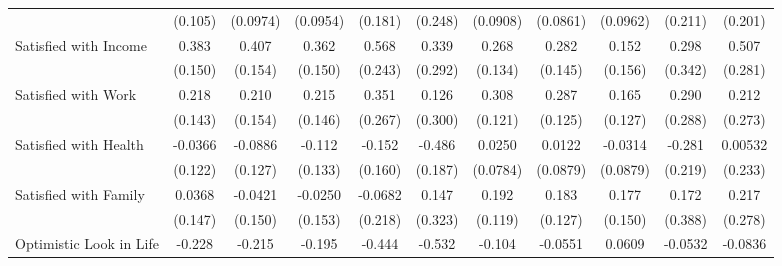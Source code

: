 {\begin{tabular}{l*{10}{c}}
            &     (0.105)         &    (0.0974)         &    (0.0954)         &     (0.181)         &     (0.248)         &    (0.0908)         &    (0.0861)         &    (0.0962)         &     (0.211)         &     (0.201)         \\
\addlinespace
Satisfied with Income&       0.383\sym{*}  &       0.407\sym{**} &       0.362\sym{*}  &       0.568\sym{*}  &       0.339         &       0.268\sym{*}  &       0.282         &       0.152         &       0.298         &       0.507         \\
            &     (0.150)         &     (0.154)         &     (0.150)         &     (0.243)         &     (0.292)         &     (0.134)         &     (0.145)         &     (0.156)         &     (0.342)         &     (0.281)         \\
\addlinespace
Satisfied with Work&       0.218         &       0.210         &       0.215         &       0.351         &       0.126         &       0.308\sym{*}  &       0.287\sym{*}  &       0.165         &       0.290         &       0.212         \\
            &     (0.143)         &     (0.154)         &     (0.146)         &     (0.267)         &     (0.300)         &     (0.121)         &     (0.125)         &     (0.127)         &     (0.288)         &     (0.273)         \\
\addlinespace
Satisfied with Health&     -0.0366         &     -0.0886         &      -0.112         &      -0.152         &      -0.486\sym{**} &      0.0250         &      0.0122         &     -0.0314         &      -0.281         &     0.00532         \\
            &     (0.122)         &     (0.127)         &     (0.133)         &     (0.160)         &     (0.187)         &    (0.0784)         &    (0.0879)         &    (0.0879)         &     (0.219)         &     (0.233)         \\
\addlinespace
Satisfied with Family&      0.0368         &     -0.0421         &     -0.0250         &     -0.0682         &       0.147         &       0.192         &       0.183         &       0.177         &       0.172         &       0.217         \\
            &     (0.147)         &     (0.150)         &     (0.153)         &     (0.218)         &     (0.323)         &     (0.119)         &     (0.127)         &     (0.150)         &     (0.388)         &     (0.278)         \\
\addlinespace
Optimistic Look in Life&      -0.228\sym{**} &      -0.215\sym{*}  &      -0.195\sym{*}  &      -0.444\sym{**} &      -0.532\sym{***}&      -0.104         &     -0.0551         &      0.0609         &     -0.0532         &     -0.0836         \\

\end{tabular}}
